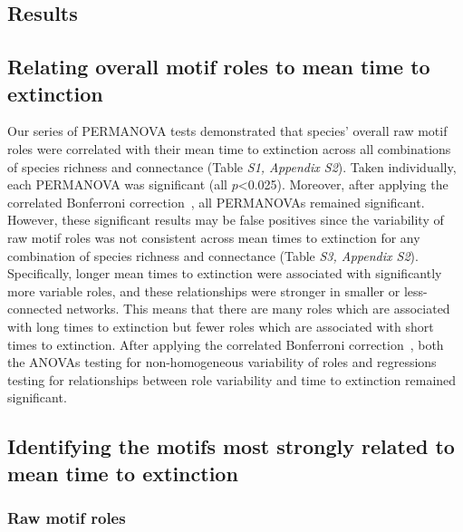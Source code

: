 \documentclass[12pt]{article}
\begin{document}
\begin{spacing}{2.0}
\section*{Results}
	
    \subsection*{Relating overall motif roles to mean time to extinction}
    
		Our series of PERMANOVA tests demonstrated that species' overall raw motif roles were correlated with their mean time to extinction across all combinations of species richness and connectance (Table \emph{S1, Appendix S2}). Taken individually, each PERMANOVA was significant (all $p$\textless0.025). Moreover, after applying the correlated Bonferroni correction~\citep{Drezner2016}, all PERMANOVAs remained significant.
		However, these significant results may be false positives since the variability of raw motif roles was not consistent across mean times to extinction for any combination of species richness and connectance (Table \emph{S3, Appendix S2}). 
		Specifically, longer mean times to extinction were associated with significantly more variable roles, and these relationships were stronger in smaller or less-connected networks. 
		This means that there are many roles which are associated with long times to extinction but fewer roles which are associated with short times to extinction.
		After applying the correlated Bonferroni correction~\citep{Drezner2016}, both the ANOVAs testing for non-homogeneous variability of roles and regressions testing for relationships between role variability and time to extinction remained significant.
    

	\subsection*{Identifying the motifs most strongly related to mean time to extinction}

        \subsubsection*{Raw motif roles}
        

\end{spacing}
\end{document}
